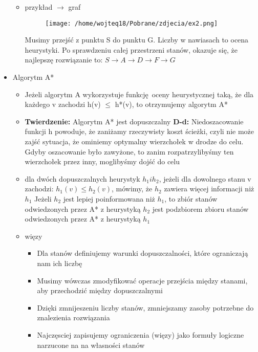 \documentclass{article}
\begin{document}
\begin{itemize}
\begin{itemize}
            \vspace{5\baselineskip}
            \item przykład $\rightarrow$ graf
            \begin{figure}[H]
                \centering
                \texttt{[image: /home/wojteq18/Pobrane/zdjecia/ex2.png]}
                \label{fig:dfs_image}
            \end{figure}
            Musimy przejść z punktu S do punktu G. Liczby w nawiasach to ocena heurystyki. \newline
            Po sprawdzeniu całej przestrzeni stanów, okazuje się, że najlepszę rozwiązanie to: \newline
            $ S \rightarrow A \rightarrow D \rightarrow F \rightarrow G $ \newline
        \end{itemize}
        \item Algorytm A*
            \begin{itemize}
                \item Jeżeli algorytm A wykorzystuje funkcję oceny heurystycznej taką, że dla każdego v zachodzi h(v) $\leq$ h*(v), 
                to otrzymujemy algorytm A*
                \item \textbf{Twierdzenie:} Algorytm A* jest dopuszczalny \newline
                \textbf{D-d:} Niedoszacowanie funkcji h powoduje, że zaniżamy rzeczywisty koszt ścieżki, czyli nie może zajść sytuacja, 
                że ominiemy optymalny wierzchołek w drodze do celu. Gdyby oszacowanie było zawyżone, to zanim rozpatrzylibyśmy ten 
                wierzchołek przez inny, moglibyśmy dojść do celu
                \vspace{3\baselineskip}
                \item dla dwóch dopuszczalnych heurystyk $h_1 i h_2$, jeżeli dla dowolnego stanu v zachodzi: 
                $h_1(v) \leq h_2(v)$, mówimy, że $h_2$ zawiera więcej informacji niż $h_1$
                Jeżeli $h_2$ jest lepiej poinformowana niż $h_1$, to zbiór stanów odwiedzonych przez A* z heurystyką $h_2$ jest podzbiorem
                zbioru stanów odwiedzonych przez A* z heurystyką $h_1$
                \item więzy
                \begin{itemize}
                    \item Dla stanów definiujemy warunki dopuszczalności, które ograniczają nam ich liczbę
                    \item Musimy wówczas zmodyfikować operacje przejścia między stanami, aby przechodzić między dopuszczalnymi
                    \item Dzięki zmnijeszeniu liczby stanów, zmniejszamy zasoby potrzebne do znalezienia rozwiązania
                    \item Najczęsciej zapisujemy ograniczenia (więzy) jako formuły logiczne narzucone na na własności stanów
                \end{itemize}
            \end{itemize}   

\end{itemize}
\end{document}

